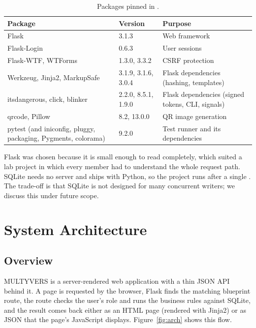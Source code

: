 \documentclass[11pt,a4paper]{article}
\DeclareRobustCommand{\code}[1]{\texttt{\StrSubstitute{\detokenize{#1}}{\string_}{\_\allowbreak}}}
\begin{document}
\begin{table}[H]
\centering
\caption{Packages pinned in \code{requirements.txt}.}
\label{tab:req}
\small
\begin{tabularx}{\textwidth}{@{}p{3.9cm}p{2.2cm}X@{}}
\toprule
\textbf{Package} & \textbf{Version} & \textbf{Purpose}\\
\midrule
Flask & 3.1.3 & Web framework\\
Flask-Login & 0.6.3 & User sessions\\
Flask-WTF, WTForms & 1.3.0, 3.3.2 & CSRF protection\\
Werkzeug, Jinja2, MarkupSafe & 3.1.9, 3.1.6, 3.0.4 & Flask dependencies (hashing, templates)\\
itsdangerous, click, blinker & 2.2.0, 8.5.1, 1.9.0 & Flask dependencies (signed tokens, CLI, signals)\\
qrcode, Pillow & 8.2, 13.0.0 & QR image generation\\
pytest (and iniconfig, pluggy, packaging, Pygments, colorama) & 9.2.0 & Test runner and its dependencies\\
\bottomrule
\end{tabularx}
\end{table}

\noindent Flask was chosen because it is small enough to read completely, which suited a lab project in which every
member had to understand the whole request path. SQLite needs no server and ships with Python, so
the project runs after a single \code{pip install}. The trade-off is that SQLite is not designed for many
concurrent writers; we discuss this under future scope.

\section{System Architecture}
\label{sec:arch}

\subsection{Overview}
MULTYVERS is a server-rendered web application with a thin JSON API behind it. A page is requested
by the browser, Flask finds the matching blueprint route, the route checks the user's role and
runs the business rules against SQLite, and the result comes back either as an HTML page (rendered with
Jinja2) or as JSON that the page's JavaScript displays. Figure~\ref{fig:arch} shows this flow.
\end{document}
